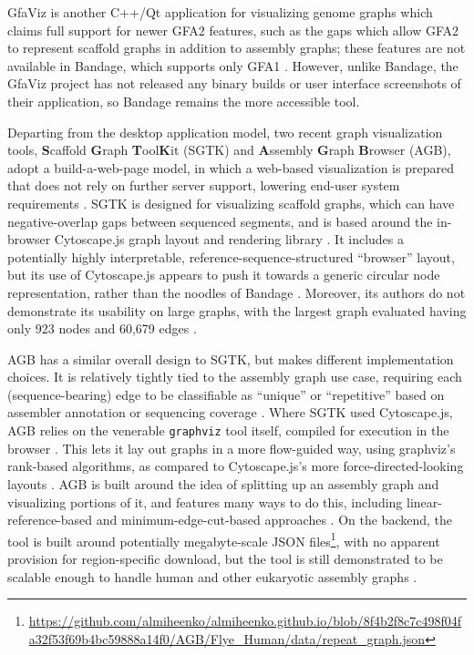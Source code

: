 GfaViz is another C++/Qt application for visualizing genome graphs which claims full support for newer GFA2 features, such as the gaps which allow GFA2 to represent scaffold graphs in addition to assembly graphs; these features are not available in Bandage, which supports only GFA1 \citep{Gonnella_2018}.
However, unlike Bandage, the GfaViz project has not released any binary builds or user interface screenshots of their application, so Bandage remains the more accessible tool.

Departing from the desktop application model, two recent graph visualization tools, \textbf{S}caffold \textbf{G}raph \textbf{T}ool\textbf{K}it (SGTK) and \textbf{A}ssembly \textbf{G}raph \textbf{B}rowser (AGB), adopt a build-a-web-page model, in which a web-based visualization is prepared that does not rely on further server support, lowering end-user system requirements \citep{Kunyavskaya_2018,Mikheenko_2019}.
SGTK is designed for visualizing scaffold graphs, which can have negative-overlap gaps between sequenced segments, and is based around the in-browser Cytoscape.js graph layout and rendering library \citep{Kunyavskaya_2018}.
It includes a potentially highly interpretable, reference-sequence-structured ``browser'' layout, but its use of Cytoscape.js appears to push it towards a generic circular node representation, rather than the noodles of Bandage \citep{Kunyavskaya_2018}.
Moreover, its authors do not demonstrate its usability on large graphs, with the largest graph evaluated having only 923 nodes and 60,679 edges \citep{Kunyavskaya_2018}.

AGB has a similar overall design to SGTK, but makes different implementation choices.
It is relatively tightly tied to the assembly graph use case, requiring each (sequence-bearing) edge to be classifiable as ``unique'' or ``repetitive'' based on assembler annotation or sequencing coverage \citep{Mikheenko_2019}.
Where SGTK used Cytoscape.js, AGB relies on the venerable \texttt{graphviz} tool itself, compiled for execution in the browser \citep{Mikheenko_2019, Ellson_2001}.
This lets it lay out graphs in a more flow-guided way, using graphviz's rank-based algorithms, as compared to Cytoscape.js's more force-directed-looking layouts \citep{Mikheenko_2019, Kunyavskaya_2018}.
AGB is built around the idea of splitting up an assembly graph and visualizing portions of it, and features many ways to do this, including linear-reference-based and minimum-edge-cut-based approaches \citep{Mikheenko_2019}.
On the backend, the tool is built around potentially megabyte-scale JSON files\footnote{\url{https://github.com/almiheenko/almiheenko.github.io/blob/8f4b2f8c7c498f04fa32f53f69b4bc59888a14f0/AGB/Flye_Human/data/repeat_graph.json}}, with no apparent provision for region-specific download, but the tool is still demonstrated to be scalable enough to handle human and other eukaryotic assembly graphs \citep{Mikheenko_2019}.

